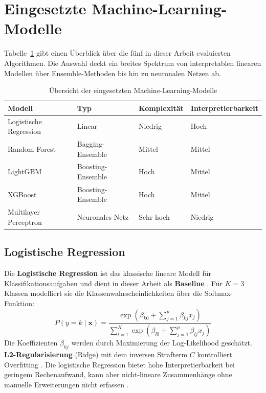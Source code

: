 \section{Eingesetzte Machine-Learning-Modelle}
\label{sec:modelle}

Tabelle~\ref{tab:model-uebersicht} gibt einen Überblick über die fünf
in dieser Arbeit evaluierten Algorithmen. Die Auswahl deckt ein breites
Spektrum von interpretablen linearen Modellen über Ensemble-Methoden bis
hin zu neuronalen Netzen ab.

\begin{table}[h]
    \centering
    \caption{Übersicht der eingesetzten Machine-Learning-Modelle}
    \label{tab:model-uebersicht}
    \begin{tabular}{l l l l}
        \toprule
        \textbf{Modell} & \textbf{Typ} & \textbf{Komplexität} & \textbf{Interpretierbarkeit} \\
        \midrule
        Logistische Regression & Linear           & Niedrig   & Hoch \\
        Random Forest          & Bagging-Ensemble & Mittel    & Mittel \\
        LightGBM               & Boosting-Ensemble & Hoch     & Mittel \\
        XGBoost                & Boosting-Ensemble & Hoch     & Mittel \\
        Multilayer Perceptron  & Neuronales Netz  & Sehr hoch & Niedrig \\
        \bottomrule
    \end{tabular}
\end{table}

\subsection{Logistische Regression}
\label{sec:logreg}

Die \textbf{Logistische Regression} ist das klassische lineare Modell
für Klassifikationsaufgaben und dient in dieser Arbeit als
\textbf{Baseline} \cite{JamesEtAl2021,HastieEtAl2009}. Für $K = 3$
Klassen modelliert sie die Klassenwahrscheinlichkeiten über die
Softmax-Funktion:
\begin{equation}
    P(y=k \mid \mathbf{x}) = \frac{
        \exp\!\left(\beta_{k0} + \sum_{j=1}^{p} \beta_{kj} x_j\right)
    }{
        \sum_{l=1}^{K} \exp\!\left(\beta_{l0} + \sum_{j=1}^{p} \beta_{lj} x_j\right)
    }
\end{equation}
Die Koeffizienten $\beta_{kj}$ werden durch Maximierung der
Log-Likelihood geschätzt. \textbf{L2-Regularisierung} (Ridge) mit dem
inversen Strafterm $C$ kontrolliert Overfitting \cite{HastieEtAl2009}.
Die logistische Regression bietet hohe Interpretierbarkeit bei geringem
Rechenaufwand, kann aber nicht-lineare Zusammenhänge ohne manuelle
Erweiterungen nicht erfassen \cite{BunkerThabtah2019}.

